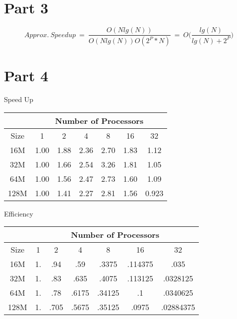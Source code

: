 \documentclass[a4paper,12pt]{article}
\begin{document}
\section*{Part 3}
    \begin{equation}
        Approx.\ Speedup\ =\ \frac{O(N lg(N))}{O(N lg(N)) O(2^P * N)}\
        =\ O \Bigg(\frac{lg(N)}{lg(N) + 2^P} \Bigg)
    \end{equation}

\section*{Part 4}
   \begin{samepage}
    \begin{center}
        Speed Up

        \begin{tabular}{| c | c | c | c | c | c | c |}
            \hline
            ~ & \multicolumn{6}{c|}{Number of Processors}\\
            \hline
            Size & 1 & 2 & 4 & 8 & 16 & 32\\
            \hline
            16M  & 1.00 & 1.88 & 2.36 & 2.70 & 1.83 & 1.12\\
            32M  & 1.00 & 1.66 & 2.54 & 3.26 & 1.81 & 1.05\\
            64M  & 1.00 & 1.56 & 2.47 & 2.73 & 1.60 & 1.09\\
            128M & 1.00 & 1.41 & 2.27 & 2.81 & 1.56 & 0.923\\
            \hline
        \end{tabular}
    \end{center}
   \end{samepage}

\newpage
   \begin{samepage}
    \begin{center}
        Efficiency

        \begin{tabular}{| c | c | c | c | c | c | c |}
            \hline
            ~ & \multicolumn{6}{c|}{Number of Processors}\\
            \hline
            Size & 1 & 2 & 4 & 8 & 16 & 32\\
            \hline
            16M  & 1.   &  .94 &  .59 & .3375 & .114375 & .035\\
            32M  & 1.   & .83  & .635 & .4075 & .113125 & .0328125\\
            64M  & 1.   & .78  & .6175& .34125& .1 & .0340625\\
            128M & 1. &  .705  & .5675& .35125& .0975& .02884375\\
            \hline
        \end{tabular}
    \end{center}
   \end{samepage}
\end{document}
